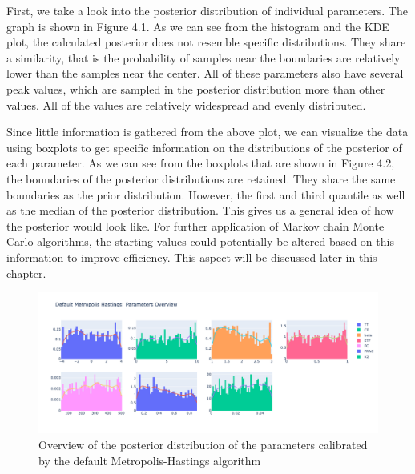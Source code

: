 First, we take a look into the posterior distribution of individual parameters. The graph is shown in Figure 4.1. As we can see from the histogram and the KDE plot, the calculated posterior does not resemble specific distributions. They share a similarity, that is the probability of samples near the boundaries are relatively lower than the samples near the center. All of these parameters also have several peak values, which are sampled in the posterior distribution more than other values. All of the values are relatively widespread and evenly distributed. 

Since little information is gathered from the above plot, we can visualize the data using boxplots to get specific information on the distributions of the posterior of each parameter. As we can see from the boxplots that are shown in Figure 4.2, the boundaries of the posterior distributions are retained. They share the same boundaries as the prior distribution. However, the first and third quantile as well as the median of the posterior distribution. This gives us a general idea of how the posterior would look like. For further application of Markov chain Monte Carlo algorithms, the starting values could potentially be altered based on this information to improve efficiency. This aspect will be discussed later in this chapter.


\begin{figure}[H]
    \centering
    \includegraphics[width=1\textwidth]{figures/basic_mh/default_mh/default_mh_parameters_overview.png}
    \captionsetup{width=.8\textwidth}
    \caption{Overview of the posterior distribution of the parameters calibrated by the default Metropolis-Hastings algorithm}
    \label{fig:enter-label}
\end{figure}



